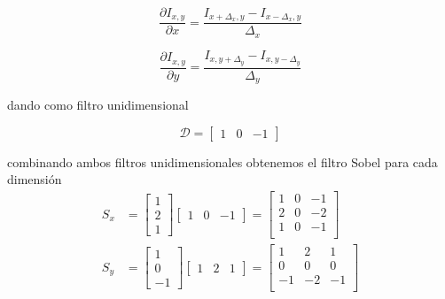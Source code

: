         $$\frac{\partial I_{x, y}}{\partial x} = \frac{I_{x+\Delta_x, y} - I_{x-\Delta_x, y}}{\Delta_x}$$
        
        $$\frac{\partial I_{x, y}}{\partial y} = \frac{I_{x, y+\Delta_y} - I_{x, y-\Delta_y}}{\Delta_y}$$
        
        \noindent dando como filtro unidimensional
        
        $$\mathcal{D} = \begin{bmatrix}
                                    1 & 0 & -1
                        \end{bmatrix}$$
                        
        \noindent combinando ambos filtros unidimensionales obtenemos el filtro Sobel para cada dimensión
        \begin{equation}
        \begin{aligned}
        S_x &=  \begin{bmatrix}
                 1\\
                 2\\
                 1
                 \end{bmatrix}
                 \begin{bmatrix}
                 1 & 0 & -1
                 \end{bmatrix}=
                 \begin{bmatrix}
                 1 &  0 &  -1\\
                 2 &  0 &  -2\\
                 1 &  0 &  -1\\
                 \end{bmatrix}\\
        S_y &=  \begin{bmatrix}
                 1\\
                 0\\
                 -1
                 \end{bmatrix}
                 \begin{bmatrix}
                 1 & 2 & 1
                 \end{bmatrix}=
                 \begin{bmatrix}
                 1 &  2 &  1\\
                 0 &  0 &  0\\
                 -1 &  -2 &  -1\\
                 \end{bmatrix}
        \end{aligned}
        \end{equation}
        
